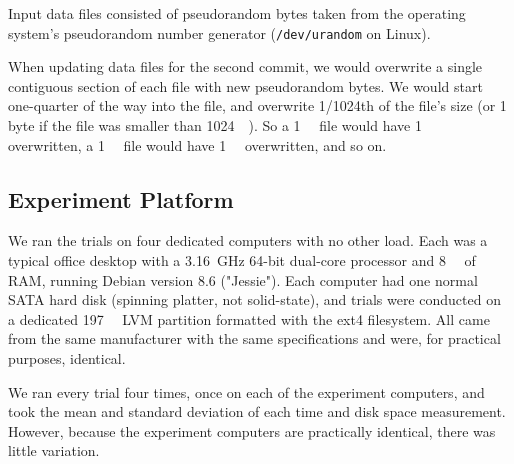 Input data files consisted of pseudorandom bytes taken from the operating system's pseudorandom number generator (\lstinline{/dev/urandom} on Linux).

When updating data files for the second \gls{commit}, we would overwrite a single contiguous section of each file with new pseudorandom bytes.
We would start one-quarter of the way into the file, and overwrite \num{1/1024}th of the file's size (or 1 byte if the file was smaller than \SI{1024}{\kibi\byte}).
So a \SI{1}{\mebi\byte} file would have \SI{1}{\kibi\byte} overwritten, a \SI{1}{\gibi\byte} file would have \SI{1}{\mebi\byte} overwritten, and so on.

%

\subsection{Experiment Platform}

We ran the trials on four dedicated computers with no other load.
Each was a typical office desktop with a \SI{3.16}{\giga\hertz} \num{64}-bit dual-core processor and \SI{8}{\gibi\byte} of RAM, running Debian version 8.6 ("Jessie").
Each computer had one normal SATA hard disk (spinning platter, not solid-state), and trials were conducted on a dedicated \SI{197}{\gibi\byte} LVM partition formatted with the ext4 filesystem.
All came from the same manufacturer with the same specifications and were, for practical purposes, identical.

We ran every trial four times, once on each of the experiment computers, and took the mean and standard deviation of each time and disk space measurement.
However, because the experiment computers are practically identical, there was little variation.

%
